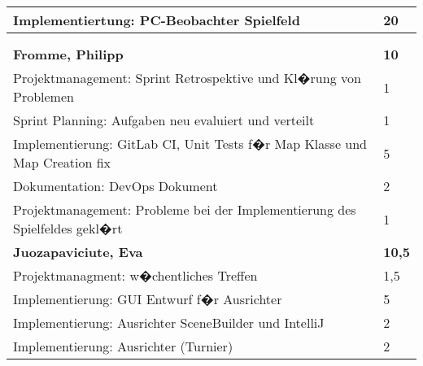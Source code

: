 \documentclass[a4paper,11pt]{scrartcl}
\begin{document}
\begin{longtable}{| p{13.8cm} | C{2.4cm} |}
  Implementiertung: PC-Beobachter Spielfeld
	&
  20
	\\
	\hline


	&

	\\
	\hline


	&

	\\
	\hline
	\hline


	\textbf{Fromme, Philipp} & \textbf{10}\\ %
	\hline

	Projektmanagement: Sprint Retrospektive und Kl�rung von Problemen
	&
	1
	\\
	\hline

	Sprint Planning: Aufgaben neu evaluiert und verteilt
	&
	1
	\\
	\hline

	Implementierung: GitLab CI, Unit Tests f�r Map Klasse und Map Creation fix
	&
	5
	\\
	\hline

  Dokumentation: DevOps Dokument
	&
  2
	\\
	\hline

  Projektmanagement: Probleme bei der Implementierung des Spielfeldes gekl�rt
	&
  1
	\\
	\hline
	\hline


	\textbf{Juozapaviciute, Eva} & \textbf{10,5}\\ %
	\hline

  Projektmanagment: w�chentliches Treffen
	&
  1,5
	\\
	\hline

  Implementierung: GUI Entwurf f�r Ausrichter
	&
  5
	\\
	\hline

  Implementierung: Ausrichter SceneBuilder und IntelliJ
	&
  2
	\\
	\hline

  Implementierung: Ausrichter (Turnier)
	&
  2
	\\
	\hline
	\hline


\end{longtable}
\end{document}
